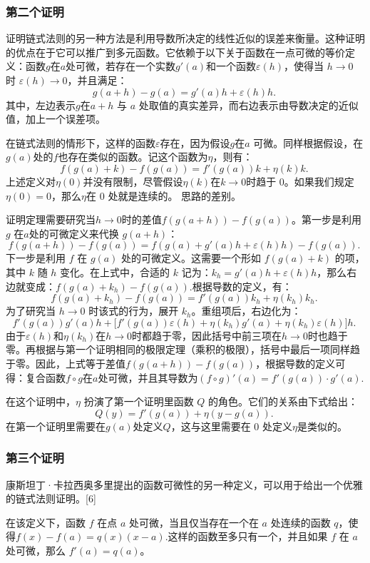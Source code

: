 \subsubsection{第二个证明}
证明链式法则的另一种方法是利用导数所决定的线性近似的误差来衡量。这种证明的优点在于它可以推广到多元函数。它依赖于以下关于函数在一点可微的等价定义：函数$g$在$a$处可微，若存在一个实数$g'(a)$和一个函数$\varepsilon(h)$，使得当 $h \to 0$ 时 $\varepsilon(h) \to 0$，并且满足：
$$
g(a+h) - g(a) = g'(a)h + \varepsilon(h)h.~
$$
其中，左边表示$g$在$a+h$ 与 $a$ 处取值的真实差异，而右边表示由导数决定的近似值，加上一个误差项。

在链式法则的情形下，这样的函数$\varepsilon$存在，因为假设$g$在$a$ 可微。同样根据假设，在$g(a)$处的$f$也存在类似的函数。记这个函数为$\eta$，则有：
$$
f(g(a)+k) - f(g(a)) = f'(g(a))k + \eta(k)k.~
$$
上述定义对$\eta(0)$并没有限制，尽管假设$\eta(k)$在$k \to 0$时趋于 0。如果我们规定$\eta(0) = 0$，那么$\eta$在 0 处就是连续的。
思路的差别。

证明定理需要研究当$h \to 0$时的差值$f(g(a+h)) - f(g(a))$。第一步是利用 $g$ 在$a$处的可微定义来代换 $g(a+h)$：
$$
f(g(a+h)) - f(g(a)) = f(g(a) + g'(a)h + \varepsilon(h)h) - f(g(a)).~
$$
下一步是利用 $f$ 在 $g(a)$ 处的可微定义。这需要一个形如 $f(g(a)+k)$ 的项，其中 $k$ 随 $h$ 变化。在上式中，合适的 $k$ 记为：$k_h = g'(a)h + \varepsilon(h)h$，那么右边就变成：$f(g(a)+k_h) - f(g(a))$.根据导数的定义，有：
$$
f(g(a)+k_h) - f(g(a)) = f'(g(a))k_h + \eta(k_h)k_h.~
$$
为了研究当 $h \to 0$ 时该式的行为，展开 $k_h$。重组项后，右边化为：
$$
f'(g(a))g'(a)h + \bigl[f'(g(a))\varepsilon(h) + \eta(k_h)g'(a) + \eta(k_h)\varepsilon(h)\bigr]h.~
$$
由于$\varepsilon(h)$和$\eta(k_h)$在$h \to 0$时都趋于零，因此括号中前三项在$h \to 0$时也趋于零。再根据与第一个证明相同的极限定理（乘积的极限），括号中最后一项同样趋于零。因此，上式等于差值$f(g(a+h)) - f(g(a))$，根据导数的定义可得：复合函数$f \circ g$在$a$处可微，并且其导数为$(f \circ g)'(a) = f'(g(a)) \cdot g'(a)$.

在这个证明中，$\eta$ 扮演了第一个证明里函数 $Q$ 的角色。它们的关系由下式给出：
$$
Q(y) = f'(g(a)) + \eta(y-g(a)).~
$$
在第一个证明里需要在$g(a)$处定义$Q$，这与这里需要在 0 处定义$\eta$是类似的。
\subsubsection{第三个证明}
康斯坦丁·卡拉西奥多里提出的函数可微性的另一种定义，可以用于给出一个优雅的链式法则证明。[6]

在该定义下，函数 $f$ 在点 $a$ 处可微，当且仅当存在一个在 $a$ 处连续的函数 $q$，使得$f(x) - f(a) = q(x)(x-a)$.这样的函数至多只有一个，并且如果 $f$ 在 $a$ 处可微，那么 $f'(a) = q(a)$。

